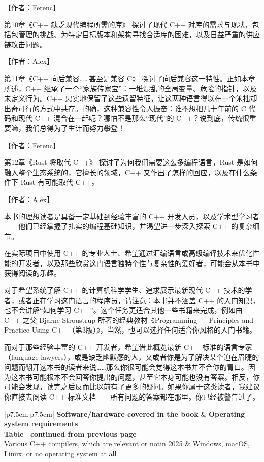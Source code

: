 【作者：Ferenc】

第10章《C++ 缺乏现代编程所需的库》 探讨了现代 C++ 对库的需求与现状，包括包管理的挑战、为特定目标版本和架构寻找合适库的困难，以及日益严重的供应链攻击问题。

【作者：Alex】

第11章《C++ 向后兼容……甚至是兼容 C》 探讨了向后兼容这一特性。正如本章所述，C++ 继承了一个“家族传家宝”：一堆混乱的全局变量、危险的指针，以及未定义行为。C++ 忠实地保留了这些遗留特征，让这两种语言得以在一个笨拙却出奇可行的方式中共存。的确，这种兼容性令人振奋：谁不想把几十年前的 C 代码和现代 C++ 混合在一起呢？哪怕不是那么“现代”的 C++？说到底，传统很重要嘛，我们总得为了生计而努力攀登！

【作者：Ferenc】

第12章《Rust 将取代 C++》 探讨了为何我们需要这么多编程语言，Rust 是如何融入整个生态系统的，它擅长的领域，C++ 又作出了怎样的回应，以及在什么条件下 Rust 有可能取代 C++。

【作者：Alex】


本书的理想读者是具备一定基础到经验丰富的 C++ 开发人员，以及学术型学习者——他们已经掌握了扎实的编程基础知识，并渴望进一步深入探索 C++ 的复杂细节。

在实际项目中使用 C++ 的专业人士、希望通过汇编语言或高级编译技术来优化性能的开发者，以及那些欣赏这门语言独特个性与复杂性的爱好者，可能会从本书中获得阅读的乐趣。

对于希望系统了解 C++ 的计算机科学学生、追求展示最新现代 C++ 技术的学者，或者正在学习这门语言的程序员，请注意：本书并不涵盖 C++ 的入门知识，也不会讲解“如何学习 C++”。这个任务更适合其他一些书籍来完成，例如由 C++ 之父 Bjarne Stroustrup 所著的经典教材《Programming — Principles and Practice Using C++（第3版）》，当然，也可以选择任何适合你风格的入门书籍。

而对于那些经验丰富的 C++ 开发者，希望借此概览最新 C++ 标准的语言专家（language lawyers），或是缺乏幽默感的人，又或者你是为了解决某个迫在眉睫的问题而翻开这本书的读者来说……那么你很可能会觉得这本书并不合你的胃口。因为这本书可能根本不会回答你提出的问题，甚至它本身可能也没有答案。相反，你可能会发现，读完之后反而比以前有了更多的疑问。如果你属于这类读者，我建议你直接去阅读 C++ 标准文档——所有问题的答案都在那里。你已经被警告过了。

\begin{longtable}{|p{7.5cm}|p{7.5cm}|}
\hline
\textbf{Software/hardware covered in the book}          & \textbf{Operating system requirements}               \\ \hline
\endfirsthead
%
%
{{\bfseries Table \thetable\ continued from previous page}} \\
\endhead
%
Various C++ compilers, which are relevant or notin 2025 & Windows, macOS, Linux, or no operating system at all \\ \hline
\end{longtable}


